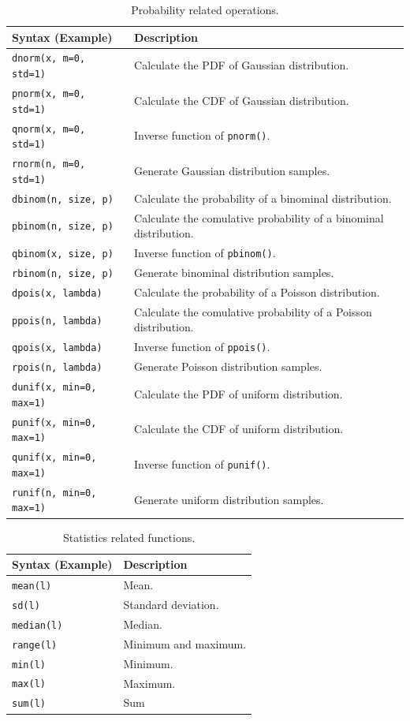 \begin{table}
	\centering \caption{Probability related operations.}\label{ch:r1:tab:probabilityfunction}
	\begin{tabularx}{\textwidth}{lX}
		\hline
		Syntax (Example) & Description \\ \hline
		\verb|dnorm(x, m=0, std=1)| & Calculate the PDF of Gaussian distribution. \\
		\verb|pnorm(x, m=0, std=1)| & Calculate the CDF of Gaussian distribution. \\
		\verb|qnorm(x, m=0, std=1)| & Inverse function of \verb|pnorm()|. \\
		\verb|rnorm(n, m=0, std=1)| & Generate Gaussian distribution samples. \\
		\verb|dbinom(n, size, p)| & Calculate the probability of a binominal distribution. \\
		\verb|pbinom(n, size, p)| & Calculate the comulative probability of a binominal distribution. \\
		\verb|qbinom(x, size, p)| & Inverse function of \verb|pbinom()|. \\
		\verb|rbinom(n, size, p)| & Generate binominal distribution samples. \\
		\verb|dpois(x, lambda)| & Calculate the probability of a Poisson distribution. \\
		\verb|ppois(n, lambda)| & Calculate the comulative probability of a Poisson distribution. \\
		\verb|qpois(x, lambda)| & Inverse function of \verb|ppois()|. \\
		\verb|rpois(n, lambda)| & Generate Poisson distribution samples. \\
		\verb|dunif(x, min=0, max=1)| & Calculate the PDF of uniform distribution. \\
		\verb|punif(x, min=0, max=1)| & Calculate the CDF of uniform distribution. \\
		\verb|qunif(x, min=0, max=1)| & Inverse function of \verb|punif()|. \\
		\verb|runif(n, min=0, max=1)| & Generate uniform distribution samples. \\
		\hline
	\end{tabularx}
\end{table}

\begin{table}
	\centering \caption{Statistics related functions.}\label{ch:r1:tab:statisticsfunction}
	\begin{tabularx}{\textwidth}{lX}
		\hline
		Syntax (Example) & Description \\ \hline
		\verb|mean(l)| & Mean. \\
		\verb|sd(l)| & Standard deviation. \\
		\verb|median(l)| & Median. \\
		\verb|range(l)| & Minimum and maximum. \\
		\verb|min(l)| & Minimum. \\
		\verb|max(l)| & Maximum. \\
		\verb|sum(l)| & Sum \\
		\hline
	\end{tabularx}
\end{table}


